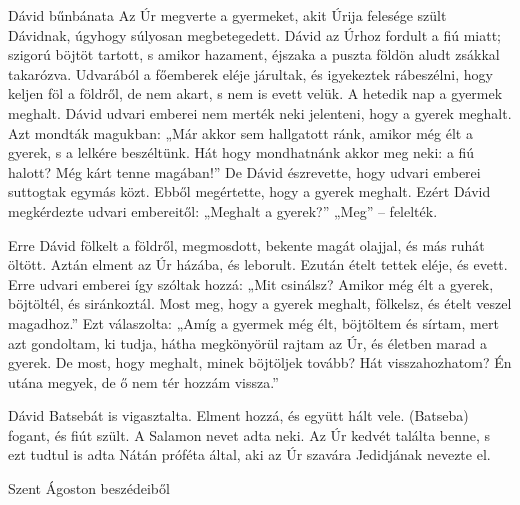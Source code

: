 \documentclass[twoside]{article}
\begin{document}
\begin{lectio}{Dávid bűnbánata}
Az Úr megverte a gyermeket, akit Úrija felesége szült Dávidnak, úgyhogy súlyosan megbetegedett. Dávid az Úrhoz fordult a fiú miatt; szigorú böjtöt tartott, s amikor hazament, éjszaka a puszta földön aludt zsákkal takarózva. Udvarából a főemberek eléje járultak, és igyekeztek rábeszélni, hogy keljen föl a földről, de nem akart, s nem is evett velük. A hetedik nap a gyermek meghalt. Dávid udvari emberei nem merték neki jelenteni, hogy a gyerek meghalt. Azt mondták magukban: „Már akkor sem hallgatott ránk, amikor még élt a gyerek, s a lelkére beszéltünk. Hát hogy mondhatnánk akkor meg neki: a fiú halott? Még kárt tenne magában!” De Dávid észrevette, hogy udvari emberei suttogtak egymás közt. Ebből megértette, hogy a gyerek meghalt. Ezért Dávid megkérdezte udvari embereitől: „Meghalt a gyerek?” „Meg” – felelték.

Erre Dávid fölkelt a földről, megmosdott, bekente magát olajjal, és más ruhát öltött. Aztán elment az Úr házába, és leborult. Ezután ételt tettek eléje, és evett. Erre udvari emberei így szóltak hozzá: „Mit csinálsz? Amikor még élt a gyerek, böjtöltél, és siránkoztál. Most meg, hogy a gyerek meghalt, fölkelsz, és ételt veszel magadhoz.” Ezt válaszolta: „Amíg a gyermek még élt, böjtöltem és sírtam, mert azt gondoltam, ki tudja, hátha megkönyörül rajtam az Úr, és életben marad a gyerek. De most, hogy meghalt, minek böjtöljek tovább? Hát visszahozhatom? Én utána megyek, de ő nem tér hozzám vissza.”

Dávid Batsebát is vigasztalta. Elment hozzá, és együtt hált vele. (Batseba) fogant, és fiút szült. A Salamon nevet adta neki. Az Úr kedvét találta benne, s ezt tudtul is adta Nátán próféta által, aki az Úr szavára Jedidjának nevezte el.
\end{lectio}



Szent Ágoston beszédeiből

{\centering{}}
\end{document}
